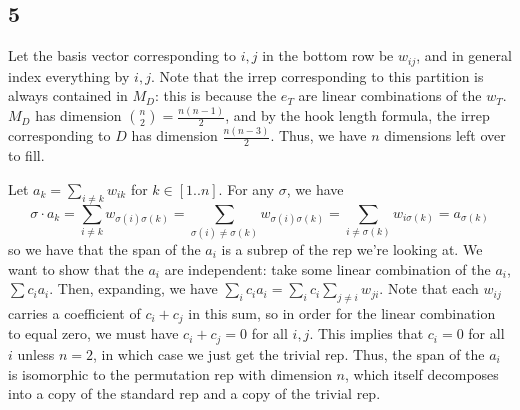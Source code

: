 \documentclass{article}
\begin{document}
\subsection*{5}
Let the basis vector corresponding to $i,j$ in the bottom row be $w_{ij}$, and in general index everything by $i,j$.
Note that the irrep corresponding to this partition is always contained in $M_D$: this is because the $e_T$ are linear combinations of the $w_T$. $M_D$ has dimension $\binom{n}{2}=\frac{n(n-1)}{2}$, and by the hook length formula, the irrep corresponding to $D$ has dimension $\frac{n(n-3)}{2}$. Thus, we have $n$ dimensions left over to fill.

Let $a_k=\sum_{i\neq k} w_{ik}$ for $k\in[1..n]$. For any $\sigma$, we have 
\[\sigma\cdot a_k=\sum_{i\neq k} w_{\sigma(i)\sigma(k)}=\sum_{\sigma(i)\neq\sigma(k)} w_{\sigma(i)\sigma(k)}=\sum_{i\neq\sigma(k)}w_{i\sigma(k)}=a_{\sigma(k)}\]
so we have that the span of the $a_i$ is a subrep of the rep we're looking at. We want to show that the $a_i$ are independent: take some linear combination of the $a_i$, $\sum c_ia_i$. Then, expanding, we have $\sum_i c_ia_i=\sum_i c_i\sum_{j\neq i}w_{ji}$. Note that each $w_{ij}$ carries a coefficient of $c_i+c_j$ in this sum, so in order for the linear combination to equal zero, we must have $c_i+c_j=0$ for all $i,j$. This implies that $c_i=0$ for all $i$ unless $n=2$, in which case we just get the trivial rep. Thus, the span of the $a_i$ is isomorphic to the permutation rep with dimension $n$, which itself decomposes into a copy of the standard rep and a copy of the trivial rep.
\end{document}

